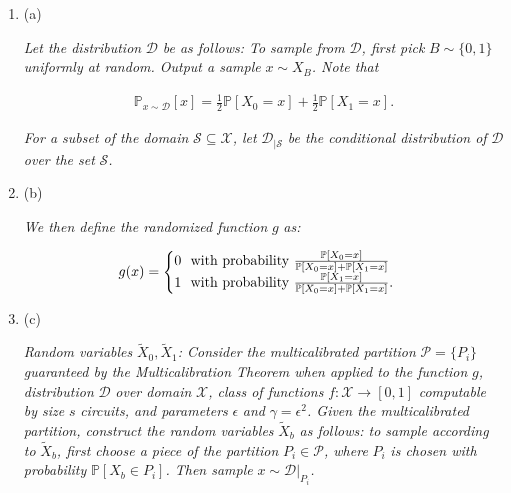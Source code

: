 \documentclass[10pt,a4paper]{article}
\begin{document}
\begin{enumerate}


\item[] 
(a) 


\emph{Let the distribution }$\mathcal{D}$\emph{ be as follows: To sample from }$\mathcal{D}$\emph{, first pick }$B\sim\{0,1\}$\emph{ uniformly at random. Output a sample }$x\sim X_{B}$\emph{. Note that}\par


\[\begin{gathered}
\mathbb{P}_{x\sim\mathcal{D}}[x]=\frac{1}{2}\mathbb{P}[X_{0}=x]+\frac{1}{2}\mathbb{P}[X_{1}=x].
\end{gathered}\]




\emph{For a subset of the domain }$\mathcal{S}\subseteq\mathcal{X}$\emph{, let }$\mathcal{D}_{|\mathcal{S}}$\emph{ be the conditional distribution of }$\mathcal{D}$\emph{ over the set }$\mathcal{S}$\emph{.}\par





\item[] 
(b) 


\emph{We then define the randomized function }$g$\emph{ as:}\par


\[\begin{gathered}
g(x)=\begin{cases}0\nobreak\ \nobreak\ \text{with probability }\frac{\mathbb{P}[X_{0}=x]}{\mathbb{P}[X_{0}=x]+\mathbb{P}[X_{1}=x]}\\
1\nobreak\ \nobreak\ \text{with probability }\frac{\mathbb{P}[X_{1}=x]}{\mathbb{P}[X_{0}=x]+\mathbb{P}[X_{1}=x]}.\end{cases}
\end{gathered}\]





\item[] 
(c) 


\emph{Random variables }$\widetilde{X}_{0},\widetilde{X}_{1}$\emph{: Consider the multicalibrated partition }$\mathcal{P}=\{P_{i}\}$\emph{ guaranteed by the Multicalibration Theorem when applied to the function }$g$\emph{, distribution }$\mathcal{D}$\emph{ over domain }$\mathcal{X}$\emph{, class of functions }$f:\mathcal{X}\to[0,1]$\emph{ computable by size }$s$\emph{ circuits, and parameters }$\epsilon$\emph{ and }$\gamma=\epsilon^{2}$\emph{. Given the multicalibrated partition, construct the random variables }$\widetilde{X}_{b}$\emph{ as follows: to sample according to }$\widetilde{X}_{b}$\emph{, first choose a piece of the partition }$P_{i}\in\mathcal{P}$\emph{, where }$P_{i}$\emph{ is chosen with probability }$\mathbb{P}[X_{b}\in P_{i}]$\emph{. Then sample }$x\sim\mathcal{D}|_{P_{i}}$\emph{.}\par





\end{enumerate}
\end{document}
